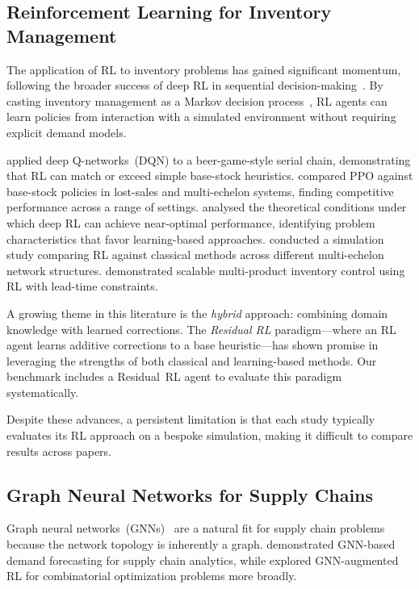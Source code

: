 \subsection{Reinforcement Learning for Inventory Management}

The application of RL to inventory problems has gained significant momentum,
following the broader success of deep RL in sequential
decision-making~\citep{silver2016mastering}. By casting inventory
management as a Markov decision process~\citep{puterman2014markov},
RL agents can learn policies from interaction with a simulated environment
without requiring explicit demand models.

\citet{oroojlooyjadid2022deep} applied deep Q-networks~(DQN) to a
beer-game-style serial chain, demonstrating that RL can match or exceed
simple base-stock heuristics. \citet{gijsbrechts2022can} compared PPO
against base-stock policies in lost-sales and multi-echelon systems,
finding competitive performance across a range of settings.
\citet{devalve2023understanding} analysed the theoretical conditions under
which deep RL can achieve near-optimal performance, identifying problem
characteristics that favor learning-based approaches.
\citet{vanderSanden2024} conducted a simulation study comparing RL
against classical methods across different multi-echelon network
structures. \citet{meisheri2022scalable} demonstrated scalable
multi-product inventory control using RL with lead-time constraints.

A growing theme in this literature is the \emph{hybrid} approach:
combining domain knowledge with learned corrections.
The \emph{Residual RL} paradigm---where an RL agent learns additive
corrections to a base heuristic---has shown promise in leveraging the
strengths of both classical and learning-based methods. Our benchmark
includes a Residual~RL agent to evaluate this paradigm systematically.

Despite these advances, a persistent limitation is that each study
typically evaluates its RL approach on a bespoke simulation, making it
difficult to compare results across papers.

\subsection{Graph Neural Networks for Supply Chains}

Graph neural networks~(GNNs)~\citep{kipf2017semi, velivckovic2018graph}
are a natural fit for supply chain problems because the network topology is
inherently a graph. \citet{li2023gnn_sc} demonstrated GNN-based demand
forecasting for supply chain analytics, while \citet{berto2024rl4co}
explored GNN-augmented RL for combinatorial optimization problems
more broadly.

